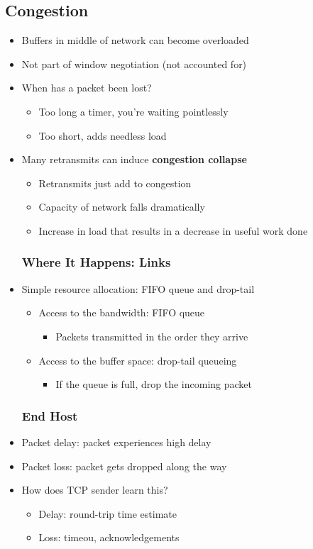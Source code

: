 \subsection{Congestion}
\begin{itemize}
	\item Buffers in middle of network can become overloaded
	\item Not part of window negotiation (not accounted for)
	\item When has a packet been lost?
	\begin{itemize}
		\item Too long a timer, you're waiting pointlessly
		\item Too short, adds needless load
	\end{itemize}
	\item Many retransmits can induce \textbf{congestion collapse}
	\begin{itemize}
		\item Retransmits just add to congestion
		\item Capacity of network falls dramatically
		\item Increase in load that results in a decrease in useful work done
	\end{itemize}
	\subsubsection{Where It Happens: Links}
	\item Simple resource allocation: FIFO queue and drop-tail
	\begin{itemize}
		\item Access to the bandwidth: FIFO queue
		\begin{itemize}
			\item Packets transmitted in the order they arrive
		\end{itemize}
		\item Access to the buffer space: drop-tail queueing
		\begin{itemize}
			\item If the queue is full, drop the incoming packet
		\end{itemize}
	\end{itemize}
	\subsubsection{End Host}
	\item Packet delay: packet experiences high delay
	\item Packet loss: packet gets dropped along the way
	\item How does TCP sender learn this?
	\begin{itemize}
		\item Delay: round-trip time estimate
		\item Loss: timeou, acknowledgements
	\end{itemize}
\end{itemize}


